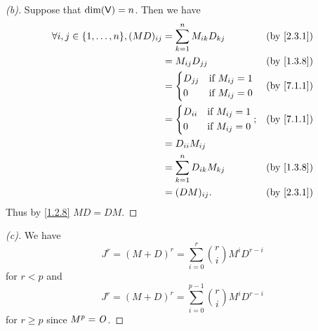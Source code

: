 \begin{proof}[(b)]
  Suppose that \(\dim(\mathsf{V}) = n\).
  Then we have
  \begin{align*}
    \forall i, j \in \set{1, \dots, n}, (MD)_{i j} & = \sum_{k = 1}^n M_{i k} D_{k j}    &  & \by{2.3.1} \\
                                                   & = M_{i j} D_{j j}                   &  & \by{1.3.8} \\
                                                   & = \begin{dcases}
                                                         D_{j j} & \text{if } M_{i j} = 1 \\
                                                         0       & \text{if } M_{i j} = 0
                                                       \end{dcases} &  & \by{7.1.1}                  \\
                                                   & = \begin{dcases}
                                                         D_{i i} & \text{if } M_{i j} = 1 \\
                                                         0       & \text{if } M_{i j} = 0
                                                       \end{dcases}; &  & \by{7.1.1}                  \\
                                                   & = D_{i i} M_{i j}                                   \\
                                                   & = \sum_{k = 1}^n D_{i k} M_{k j}    &  & \by{1.3.8} \\
                                                   & = (DM)_{i j}.                       &  & \by{2.3.1}
  \end{align*}
  Thus by \cref{1.2.8} \(MD = DM\).
\end{proof}

\begin{proof}[(c)]
  We have
  \[
    J^r = (M + D)^r = \sum_{i = 0}^r \binom{r}{i} M^i D^{r - i}
  \]
  for \(r < p\) and
  \[
    J^r = (M + D)^r = \sum_{i = 0}^{p - 1} \binom{r}{i} M^i D^{r - i}
  \]
  for \(r \geq p\) since \(M^p = \mathit{O}\).
\end{proof}

